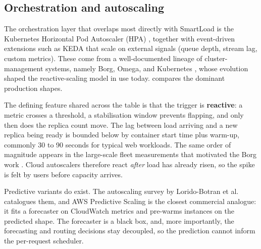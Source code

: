 \subsection{Orchestration and autoscaling}
\label{lit:sec:market-autoscale}

The orchestration layer that overlaps most directly with SmartLoad is the
Kubernetes Horizontal Pod Autoscaler (HPA) \cite{k8shpa}, together with
event-driven extensions such as KEDA \cite{keda} that scale on external signals
(queue depth, stream lag, custom metrics). These come from a well-documented
lineage of cluster-management systems, namely Borg, Omega, and Kubernetes
\cite{burns2016borgomega}, whose evolution shaped the reactive-scaling model in
use today.  compares the dominant production shapes.

The defining feature shared across the table is that the trigger is
\textbf{reactive}: a metric crosses a threshold, a stabilisation window prevents
flapping, and only then does the replica count move. The lag between load
arriving and a new replica being ready is bounded below by container start time
plus warm-up, commonly 30 to 90 seconds for typical web workloads. The same
order of magnitude appears in the large-scale fleet measurements that motivated
the Borg work \cite{verma2015borg}. Cloud autoscalers therefore react
\emph{after} load has already risen, so the spike is felt by users before
capacity arrives.

Predictive variants do exist. The autoscaling survey by Lorido-Botran et al.\
\cite{lorido2014autoscaling} catalogues them, and AWS Predictive Scaling is the
closest commercial analogue: it fits a forecaster on CloudWatch metrics and
pre-warms instances on the predicted shape. The forecaster is a black box, and,
more importantly, the forecasting and routing decisions stay decoupled, so the
prediction cannot inform the per-request scheduler.

